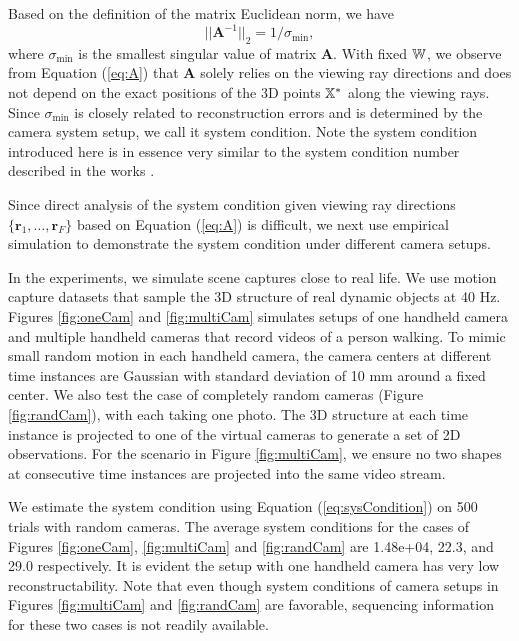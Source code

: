 Based on the definition of the matrix Euclidean norm, we have
\begin{equation}
||\mathbf{A}^{-1}||_2 = 1/\sigma_{\text{min}}, 
\label{eq:sysCondition}
\end{equation}
where $\sigma_{\text{min}}$ is the smallest singular value of matrix $\mathbf{A}$. 
With fixed $\mathbb W$, we observe from Equation (\ref{eq:A}) that $\mathbf{A}$ solely relies on the viewing ray directions and does not depend on the exact positions of the 3D points $\mathbb X^*$ along the viewing rays.
Since $\sigma_{\text{min}}$ is closely related to reconstruction errors and is determined by the camera system setup, we call it system condition. 
Note the system condition introduced here is in essence very similar to the system condition number described in the works \cite{Valmadre_CVPR2012,zheng2014joint}.

Since direct analysis of the system condition given viewing ray directions $\{\mathbf{r}_1,\dots,\mathbf{r}_F\}$ based on Equation (\ref{eq:A}) is difficult, we next use empirical simulation to demonstrate the system condition under different camera setups. %

In the experiments, we simulate scene captures close to real life.
We use motion capture datasets that sample the 3D structure of real dynamic objects at 40 Hz. 
Figures \ref{fig:oneCam} and \ref{fig:multiCam} simulates setups of one handheld camera and multiple handheld cameras that record videos of a person walking. 
To mimic small random motion in each handheld camera, 
the camera centers at different time instances are Gaussian with standard deviation of 10 mm around a fixed center. 
We also test the case of completely random cameras (Figure \ref{fig:randCam}), with each taking one photo. %
The 3D structure at each time instance is projected to one of the virtual cameras to generate a set of 2D observations. For the scenario in Figure \ref{fig:multiCam}, we ensure no two shapes at consecutive time instances are projected into the same video stream.

We estimate the system condition using Equation (\ref{eq:sysCondition}) on 500 trials with random cameras. 
The average system conditions for the cases of Figures \ref{fig:oneCam}, \ref{fig:multiCam} and \ref{fig:randCam} are 1.48e+04, 22.3, and 29.0 respectively. It is evident the setup with one handheld camera has very low reconstructability.
Note that even though system conditions of camera setups in Figures \ref{fig:multiCam} and \ref{fig:randCam} are favorable, sequencing information for these two cases is not readily available.

